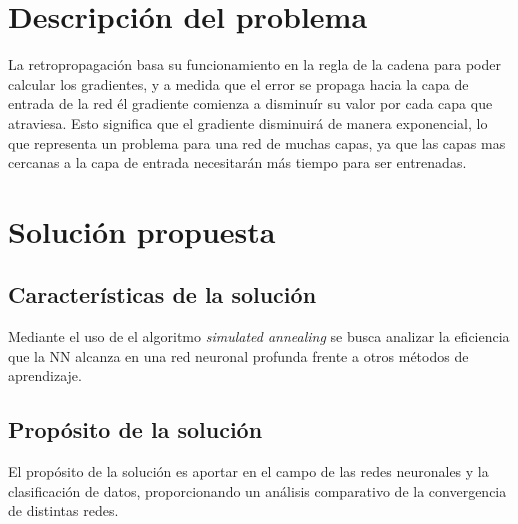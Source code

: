 

\section{Descripción del problema}
La retropropagación basa su funcionamiento en la regla de la cadena para poder calcular los gradientes, y a medida que el error se propaga hacia la capa de entrada de la red él gradiente comienza a disminuír su valor por cada capa que atraviesa. Esto significa que el gradiente disminuirá de manera exponencial, lo que representa un problema para una red de muchas capas, ya que las capas mas cercanas a la capa de entrada necesitarán más tiempo para ser entrenadas.

\section{Solución propuesta}
\subsection{Características de la solución}
Mediante el uso de el algoritmo {\em simulated annealing} se busca analizar la eficiencia que la NN alcanza en una red neuronal profunda frente a otros métodos de aprendizaje.

\subsection{Propósito de la solución}
El propósito de la solución es aportar en el campo de las redes neuronales y la clasificación de datos, proporcionando un análisis comparativo de la convergencia de distintas redes.
